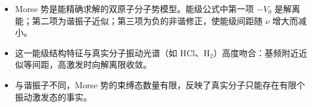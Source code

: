 \begin{insightbox}[物理图像]
\begin{itemize}
    \item Morse 势是能精确求解的双原子分子势模型。能级公式中第一项 $-V_0$ 是解离能；第二项为谐振子近似；第三项为负的非谐修正，使能级间距随 $\nu$ 增大而减小。
    \item 这一能级结构特征与真实分子振动光谱（如 HCl、H$_2$）高度吻合：基频附近近似等间距，高激发时向解离限收敛。
    \item 与谐振子不同，Morse 势的束缚态数量有限，反映了真实分子只能存在有限个振动激发态的事实。
\end{itemize}
\end{insightbox}

